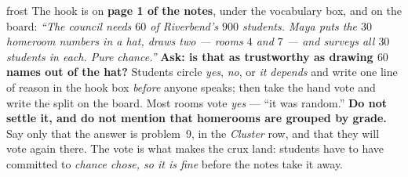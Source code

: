 \documentclass[10pt]{article}
\begin{document}
\boxguard
\begin{skillbox}{frost}
The hook is on \textbf{page 1 of the notes}, under the vocabulary box, and on the board:
\textit{``The council needs $60$ of Riverbend's $900$ students. Maya puts the $30$ homeroom
numbers in a hat, draws two --- rooms $4$ and $7$ --- and surveys all $30$ students in each.
Pure chance.''} \textbf{Ask: is that as trustworthy as drawing $60$ names out of the hat?}
Students circle \emph{yes}, \emph{no}, or \emph{it depends} and write one line of reason in the
hook box \emph{before} anyone speaks; then take the hand vote and write the split on the
board. Most rooms vote \emph{yes} --- ``it was random.'' \textbf{Do not settle it, and do not
mention that homerooms are grouped by grade.} Say only that the answer is problem~9, in the
\emph{Cluster} row, and that they will vote again there. The vote is what makes the crux land: students
have to have committed to \emph{chance chose, so it is fine} before the notes take it away.
\end{skillbox}
\end{document}
